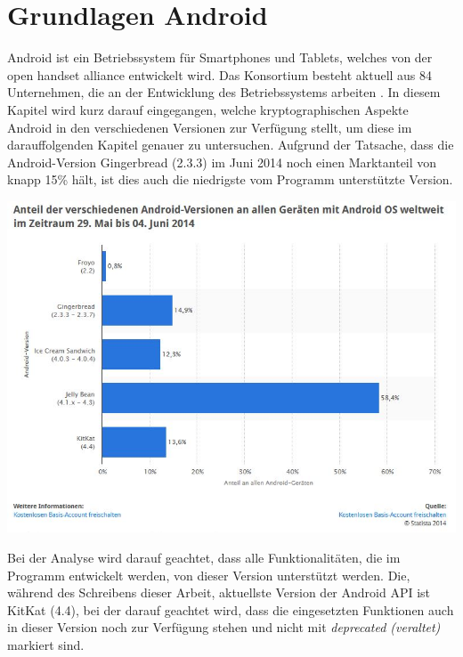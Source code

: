 \documentclass[10pt, a4paper,headsepline,pointednumbers]{scrreprt}
\begin{document}
\chapter{Grundlagen Android}
Android ist ein Betriebssystem für Smartphones und Tablets, welches von der open handset alliance entwickelt wird. Das Konsortium besteht aktuell aus 84 Unternehmen, die an der Entwicklung des Betriebssystems arbeiten \cite{website:oha-main}. 
In diesem Kapitel wird kurz darauf eingegangen, welche kryptographischen Aspekte Android in den verschiedenen Versionen zur Verfügung stellt, um diese im darauffolgenden Kapitel genauer zu untersuchen. Aufgrund der Tatsache, dass die Android-Version Gingerbread (2.3.3) im Juni 2014 noch einen Marktanteil von knapp 15\% hält, ist dies auch die niedrigste vom Programm unterstützte Version. \\

\begin{center}
\includegraphics[scale=0.6]{android_version_marktanteil.JPG} 
\end{center}
Bei der Analyse wird darauf geachtet, dass alle Funktionalitäten, die im Programm entwickelt werden, von dieser Version unterstützt werden. Die, während des Schreibens dieser Arbeit, aktuellste Version der Android API ist KitKat (4.4), bei der darauf geachtet wird, dass die eingesetzten Funktionen auch in dieser Version noch zur Verfügung stehen und nicht mit \textit{deprecated (veraltet)} markiert sind.
\end{document}
